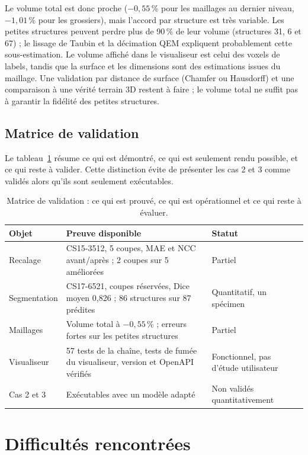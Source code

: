 \documentclass[12pt,a4paper]{report}
\begin{document}
Le volume total est donc proche ($-0{,}55$\,\% pour les maillages au dernier niveau, $-1{,}01$\,\% pour les grossiers), mais l'accord par structure est très variable. Les petites structures peuvent perdre plus de 90\,\% de leur volume (structures 31, 6 et 67) ; le lissage de Taubin et la décimation QEM expliquent probablement cette sous-estimation. Le volume affiché dans le visualiseur est celui des voxels de labels, tandis que la surface et les dimensions sont des estimations issues du maillage. Une validation par distance de surface (Chamfer ou Hausdorff) et une comparaison à une vérité terrain 3D restent à faire ; le volume total ne suffit pas à garantir la fidélité des petites structures.

\subsection{Matrice de validation}

Le tableau~\ref{tab:validation} résume ce qui est démontré, ce qui est seulement rendu possible, et ce qui reste à valider. Cette distinction évite de présenter les cas 2 et 3 comme validés alors qu'ils sont seulement exécutables.

\begin{table}[H]
\centering
\footnotesize
\begin{tabularx}{\textwidth}{@{}p{2.3cm}Xp{2.9cm}@{}}
\toprule
\textbf{Objet} & \textbf{Preuve disponible} & \textbf{Statut} \\
\midrule
Recalage & CS15-3512, 5 coupes, MAE et NCC avant/après ; 2 coupes sur 5 améliorées & Partiel \\
Segmentation & CS17-6521, coupes réservées, Dice moyen 0,826 ; 86 structures sur 87 prédites & Quantitatif, un spécimen \\
Maillages & Volume total à $-0{,}55$\,\% ; erreurs fortes sur les petites structures & Partiel \\
Visualiseur & 57 tests de la chaîne, tests de fumée du visualiseur, version et OpenAPI vérifiés & Fonctionnel, pas d'étude utilisateur \\
Cas 2 et 3 & Exécutables avec un modèle adapté & Non validés quantitativement \\
\bottomrule
\end{tabularx}
\caption{Matrice de validation : ce qui est prouvé, ce qui est opérationnel et ce qui reste à évaluer.}
\label{tab:validation}
\end{table}

\section{Difficultés rencontrées}
\end{document}
